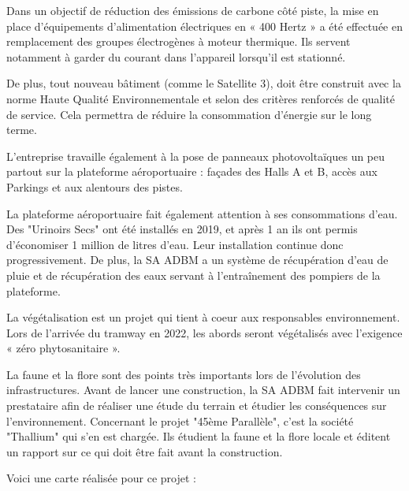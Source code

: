 Dans un objectif de réduction des émissions de carbone côté piste, la mise en place d’équipements d’alimentation électriques en « 400 Hertz » a été effectuée en remplacement des groupes électrogènes à moteur thermique. Ils servent notamment à garder du courant dans l'appareil lorsqu'il est stationné.


De plus, tout nouveau bâtiment (comme le Satellite 3), doit être construit avec la norme Haute Qualité Environnementale et selon des critères renforcés de qualité de service. Cela permettra de réduire la consommation d'énergie sur le long terme.\newline


L'entreprise travaille également à la pose de panneaux photovoltaïques un peu partout sur la plateforme aéroportuaire : façades des Halls A et B, accès aux Parkings et aux alentours des pistes.


La plateforme aéroportuaire fait également attention à ses consommations d'eau. Des "Urinoirs Secs" ont été installés en 2019, et après 1 an ils ont permis d'économiser 1 million de litres d'eau. Leur installation continue donc progressivement.
De plus, la SA ADBM a un système de récupération d'eau de pluie et de récupération des eaux servant à l'entraînement des pompiers de la plateforme.\newline


La végétalisation est un projet qui tient à coeur aux responsables environnement. Lors de l'arrivée du tramway en 2022, les abords seront végétalisés avec l'exigence « zéro phytosanitaire ».\newline


La faune et la flore sont des points très importants lors de l'évolution des infrastructures. Avant de lancer une construction, la SA ADBM fait intervenir un prestataire afin de réaliser une étude du terrain et étudier les conséquences sur l'environnement.
Concernant le projet "45ème Parallèle", c'est la société "Thallium" qui s'en est chargée. Ils étudient la faune et la flore locale et éditent un rapport sur ce qui doit être fait avant la construction.

Voici une carte réalisée pour ce projet :

